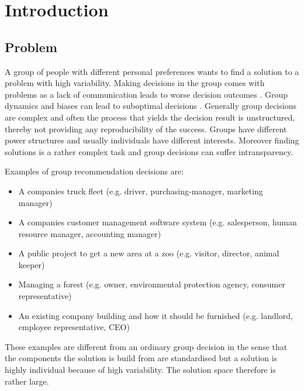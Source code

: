 \chapter{Introduction}
\label{ch:Introduction}



\section{Problem}
\label{sec:Introduction:Problem}

A group of people with different personal preferences wants to find a solution to a problem with high variability. Making decisions in the group comes with problems as a lack of communication leads to worse decision outcomes \cite{atasItemRecommendationUsing2017}. Group dynamics and biases can lead to suboptimal decisions \cite{kerrBiasJudgmentComparing1996}. Generally group decisions are complex and often the process that yields the decision result is unstructured, thereby not providing any reproducibility of the success. Groups have different power structures and usually individuals have different interests. Moreover finding solutions is a rather complex task and group decisions can suffer intransparency.

Examples of group recommendation decisions are:
\begin{itemize}
    \item A companies truck fleet (e.g. driver, purchasing-manager, marketing manager)
    \item A companies customer management software system (e.g. salesperson, human resource manager, accounting manager)
    \item A public project to get a new area at a zoo (e.g. visitor, director, animal keeper)
    \item Managing a forest (e.g. owner, environmental protection agency, consumer representative)
    \item An existing company building and how it should be furnished (e.g. landlord, employee representative, CEO)
\end{itemize}

These examples are different from an ordinary group decision in the sense that the components the solution is build from are standardised but a solution is highly individual because of high variability. The solution space therefore is rather large.

